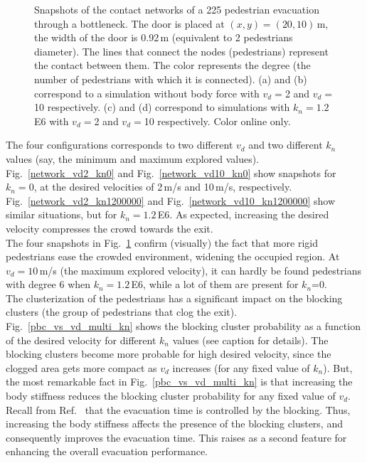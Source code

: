 \documentclass[preprint,12pt]{elsarticle}
\begin{document}
\begin{figure}[!htbp]
\caption[width=0.47\columnwidth]{Snapshots of the contact networks of a 225 pedestrian evacuation through a bottleneck. The door is placed at $(x,y)=(20,10)\,$m, the width of the door is 0.92$\,$m (equivalent to 2 pedestrian\textsc{}s diameter). The lines that connect the nodes (pedestrians) represent the contact between them. The color represents the degree (the number of pedestrians with which it is connected). (a) and (b) correspond to a simulation without body force with $v_d=$2 and $v_d=$10 respectively. (c) and (d) correspond to simulations with $k_n=1.2\,$E6 with $v_d=$2 and $v_d=$10 respectively. Color online only.}
\label{network_bottleneck}
\end{figure}



The four configurations corresponds to two different $v_d$ and two different $k_n$ values (say, the  minimum and maximum explored values). Fig.~\ref{network_vd2_kn0} and Fig.~\ref{network_vd10_kn0} show snapshots for $k_n=0$, at the desired velocities of 2$\,$m/s and 10$\,$m/s, respectively.    Fig.~\ref{network_vd2_kn1200000} and Fig.~\ref{network_vd10_kn1200000} show similar situations, but for  $k_n=1.2\,$E6. As expected, increasing the desired velocity compresses the crowd towards the exit. \\

The four snapshots in Fig.~\ref{network_bottleneck} confirm (visually) the fact that more rigid pedestrians ease the crowded environment, widening the occupied region. At $v_d=10\,$m/s (the maximum explored velocity), it can hardly be found pedestrians with degree 6 when $k_n=1.2\,$E6, while a lot of them are present for $k_n$=0.\\

The clusterization of the pedestrians has a significant impact on the blocking clusters (the group of pedestrians that clog the exit).  Fig.~\ref{pbc_vs_vd_multi_kn} shows the blocking cluster probability as a function of the desired velocity for different $k_n$ values (see caption for details). The blocking clusters become more probable for high desired velocity, since the clogged area gets more compact as $v_d$ increases (for any fixed value of $k_n$). But, the most remarkable fact in Fig.~\ref{pbc_vs_vd_multi_kn} is that increasing the body stiffness reduces the blocking cluster probability for any fixed value of $v_d$. Recall from Ref.~\cite{dorso_2005} that the evacuation time is controlled by the blocking. Thus, increasing the body stiffness affects the presence of the blocking clusters, and consequently improves the evacuation time. This raises as a second feature for enhancing the overall evacuation performance. \\
\end{document}
